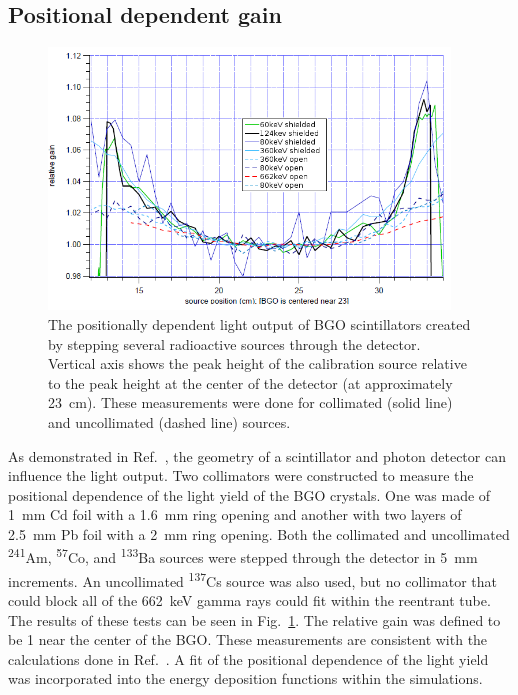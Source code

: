 \documentclass[oneside,12pt]{memoir}
\begin{document}
\subsection{Positional dependent gain}
\label{sec:bgo_position}
\begin{figure}[t]
	\centering
	\includegraphics[width=0.95\textwidth]{position_dep.png}
	\caption[Positional dependent light output of BGO scintillators.]{The positionally dependent light output of BGO scintillators created by stepping several radioactive sources through the detector. Vertical axis shows the peak height of the calibration source relative to the peak height at the center of the detector (at approximately 23~cm). These measurements were done for collimated (solid line) and uncollimated (dashed line) sources.}
	\label{fig:posgain}
\end{figure}
As demonstrated in Ref.~\cite{keil70}, the geometry of a scintillator and photon detector can influence the light output. Two collimators were constructed to measure the positional dependence of the light yield of the BGO crystals. One was made of 1~mm Cd foil with a 1.6~mm ring opening and another with two layers of 2.5~mm Pb foil with a 2~mm ring opening. Both the collimated and uncollimated \textsuperscript{241}Am, \textsuperscript{57}Co, and \textsuperscript{133}Ba sources were stepped through the detector in 5~mm increments. An uncollimated \textsuperscript{137}Cs source was also used, but no collimator that could block all of the 662~keV gamma rays could fit within the reentrant tube. The results of these tests can be seen in Fig.~\ref{fig:posgain}. The relative gain was defined to be 1 near the center of the BGO. These measurements are consistent with the calculations done in Ref.~\cite{keil70}. A fit of the positional dependence of the light yield was incorporated into the energy deposition functions within the simulations.
\end{document}
